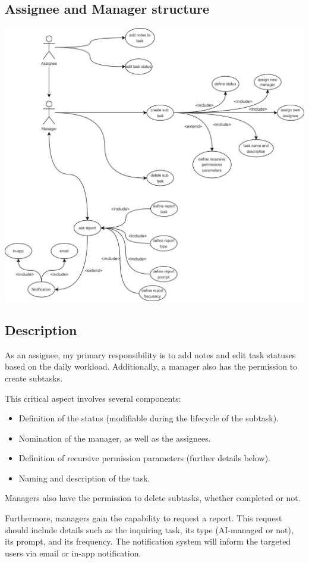 \documentclass{article}
\begin{document}
\subsection{Assignee and Manager structure}
\includegraphics[width=\textwidth, keepaspectratio]{images/UseCaseDiagram/UseCaseAssigneeManager.jpg}
\subsection*{Description}
As an assignee, my primary responsibility is to add notes and edit task statuses based on the daily workload. Additionally, a manager also has the permission to create subtasks.

This critical aspect involves several components:
\begin{itemize}
\item Definition of the status (modifiable during the lifecycle of the subtask).
\item Nomination of the manager, as well as the assignees.
\item Definition of recursive permission parameters (further details below).
\item Naming and description of the task.
\end{itemize}

Managers also have the permission to delete subtasks, whether completed or not.

Furthermore, managers gain the capability to request a report. This request should include details such as the inquiring task, its type (AI-managed or not), its prompt, and its frequency. The notification system will inform the targeted users via email or in-app notification.
\end{document}
